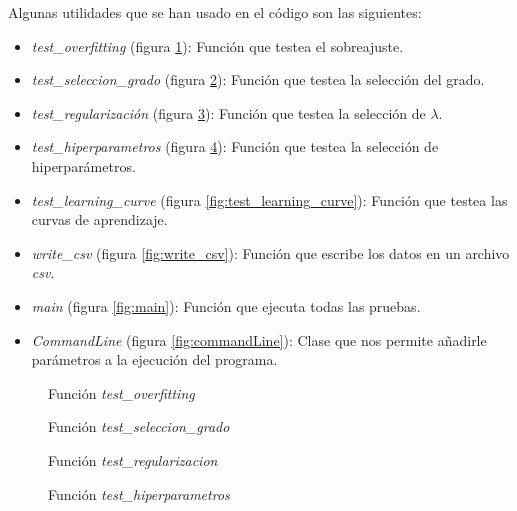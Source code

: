 \documentclass[6pt]{AiTex}
\begin{document}
Algunas utilidades que se han usado en el código son las siguientes:
\begin{itemize}
    \item \textit{test\_overfitting} (figura \ref{fig:test_overfitting}): Función que testea el sobreajuste.
    \item \textit{test\_seleccion\_grado} (figura \ref{fig:test_seleccion_grado}): Función que testea la selección del grado.
    \item \textit{test\_regularización} (figura \ref{fig:test_regularizacion}): Función que testea la selección de $\lambda$.
    \item \textit{test\_hiperparametros} (figura \ref{fig:test_hiperparametros}): Función que testea la selección de hiperparámetros.
    \item \textit{test\_learning\_curve} (figura \ref{fig:test_learning_curve}): Función que testea las curvas de aprendizaje.
    \item \textit{write\_csv} (figura \ref{fig:write_csv}): Función que escribe los datos en un archivo \textit{csv}.
    \item \textit{main} (figura \ref{fig:main}): Función que ejecuta todas las pruebas.
    \item \textit{CommandLine} (figura \ref{fig:commandLine}): Clase que nos permite añadirle parámetros a la ejecución del programa.
\end{itemize}

\begin{figure}[H]
    \centering
    
    \caption{Función \textit{test\_overfitting}}
    \label{fig:test_overfitting}
\end{figure}

\begin{figure}[H]
    \centering
    
    \caption{Función \textit{test\_seleccion\_grado}}
    \label{fig:test_seleccion_grado}
\end{figure}

\begin{figure}[H]
    \centering
    
    \caption{Función \textit{test\_regularizacion}}
    \label{fig:test_regularizacion}
\end{figure}

\begin{figure}[H]
    \centering
    
    \caption{Función \textit{test\_hiperparametros}}
    \label{fig:test_hiperparametros}
\end{figure}
\end{document}
